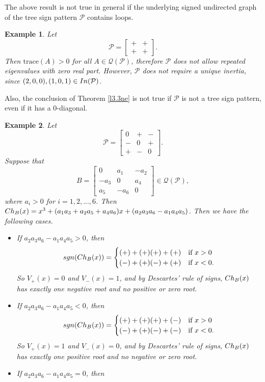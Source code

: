 \documentclass[10pt,a4paper]{amsart}
\newtheorem{eg}{Example}[section]
\numberwithin{equation}{section}
\def\sgn{{\rm sgn}}
\def\In{{\rm In}}
\def\Ch{{\rm Ch}}
\begin{document}
	The above result is not true in general if the underlying signed undirected graph of the tree sign pattern $\mathcal{P}$ contains loops.
	\begin{eg}
		Let $$\mathcal{P}=\begin{bmatrix}
			+&+\\+&+
		\end{bmatrix}.$$ Then $\text{trace}(A)>0$ for all $A\in \mathcal{Q}(\mathcal{P})$, therefore $\mathcal{P}$ does not allow repeated eigenvalues with zero real part. However, $\mathcal{P}$ does not require a unique inertia, since $(2,0,0),(1,0,1)\in \In(\mathcal{P})$.   
	\end{eg}
	Also, the conclusion of Theorem \ref{l3.3ne} is not true if $\mathcal{P}$ is not a tree sign pattern, even if it has a $0$-diagonal.
	\begin{eg}\label{example2.6}
		Let $$\mathcal{P}=\begin{bmatrix}
			0&+&-\\-&0&+\\+&-&0
		\end{bmatrix}.$$ Suppose that $$B=\begin{bmatrix}
			0&a_1&-a_2\\-a_3&0&a_4\\a_5&-a_6&0
		\end{bmatrix}\in \mathcal{Q}(\mathcal{P}),$$
		where $a_i>0$ for $i=1,2,...,6$. Then $\Ch_B(x)=x^3+(a_1a_3+a_2a_5+a_4a_6)x+(a_2a_3a_6-a_1a_4a_5)$. Then we have the following cases.
		\begin{itemize}
			\item[i.] If $a_2a_3a_6-a_1a_4a_5>0$, then
			$$
			\sgn(\Ch_B(x)) = \begin{cases} 
				(+)+(+)(+)+(+) & \text{if} ~ x> 0 \\
				(-)+(+)(-)+(+) & \text{if} ~x<0.
			\end{cases}
			$$
			So $V_+(x)=0$ and $V_-(x)=1$, and by Descartes' rule of signs, $\Ch_B(x)$ has exactly one negative root and no positive or zero root.
			\item[ii.] If $a_2a_3a_6-a_1a_4a_5<0$, then
			$$
			\sgn(\Ch_B(x)) = \begin{cases} 
				(+)+(+)(+)+(-) & \text{if} ~ x> 0 \\
				(-)+(+)(-)+(-) & \text{if} ~x<0.
			\end{cases}
			$$
			So $V_+(x)=1$ and $V_-(x)=0$, and by Descartes' rule of signs, $\Ch_B(x)$ has exactly one positive root and no negative or zero root.
			\item[iii.] If $a_2a_3a_6-a_1a_4a_5=0$, then

\end{itemize}
\end{eg}
\end{document}
